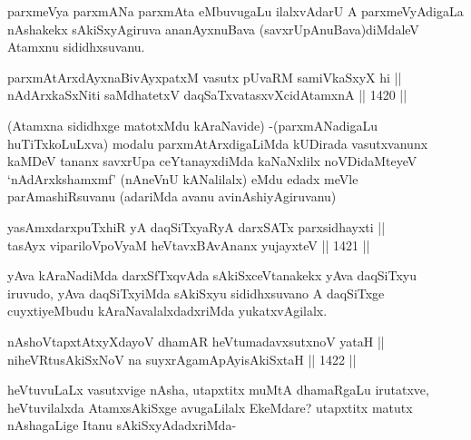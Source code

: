 \begin{artha}
parxmeVya parxmANa parxmAta eMbuvugaLu ilalxvAdarU A parxmeVyAdigaLa nAshakekx sAkiSxyAgiruva ananAyxnuBava (savxrUpAnuBava)diMdaleV Atamxnu sididhxsuvanu.
\end{artha}

\begin{shl}
parxmAtArxdAyxnaBivAyxpatxM vasutx pUvaRM samiVkaSxyX hi || \\
nAdArxkaSxNiti saMdhatetxV daqSaTxvatasxvXcidAtamxnA ||  1420 ||  
\end{shl}

\begin{artha}
(Atamxna sididhxge matotxMdu kAraNavide) -(parxmANadigaLu huTiTxkoLuLxva) modalu parxmAtArxdigaLiMda kUDirada vasutxvanunx kaMDeV tananx savxrUpa ceYtanayxdiMda kaNaNxlilx noVDidaMteyeV `nAdArxkshamxmf' (nAneVnU kANalilalx) eMdu edadx meVle parAmashiRsuvanu (adariMda avanu avinAshiyAgiruvanu)
\end{artha}


\begin{shl}
yasAmxdarxpuTxhiR yA daqSiTxyaRyA darxSATx parxsidhayxti || \\
tasAyx vipariloVpoV\s yaM heVtavxBAvAnanx yujayxteV ||  1421 ||  
\end{shl}

\begin{artha}
yAva kAraNadiMda darxSfTxqvAda sAkiSxceVtanakekx yAva daqSiTxyu iruvudo, yAva daqSiTxyiMda sAkiSxyu sididhxsuvano A daqSiTxge cuyxtiyeMbudu kAraNavalalxdadxriMda yukatxvAgilalx.
\end{artha}


\begin{shl}
nAshoVtapxtAtxyXdayoV dhamAR heVtumadavxsutxnoV yataH || \\
niheVRtusAkiSxNoV na suyxrAgamApAyisAkiSxtaH ||  1422 ||  
\end{shl}

\begin{artha}
heVtuvuLaLx vasutxvige nAsha, utapxtitx muMtA dhamaRgaLu irutatxve, heVtuvilalxda AtamxsAkiSxge avugaLilalx EkeMdare? utapxtitx matutx nAshagaLige Itanu sAkiSxyAdadxriMda-
\end{artha}


